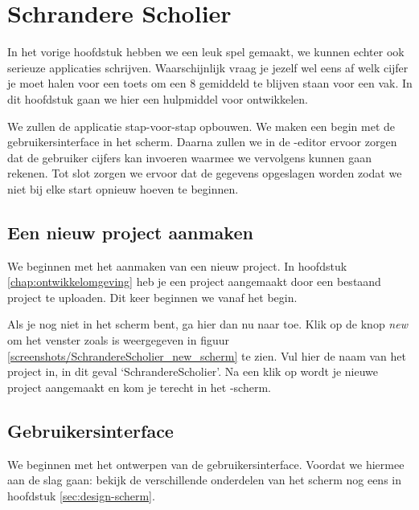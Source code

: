 \chapter{Schrandere Scholier}

In het vorige hoofdstuk hebben we een leuk spel gemaakt, we kunnen echter ook serieuze applicaties schrijven. Waarschijnlijk vraag je jezelf wel eens af welk cijfer je moet halen voor een toets om een 8 gemiddeld te blijven staan voor een vak. In dit hoofdstuk gaan we hier een hulpmiddel voor ontwikkelen.

We zullen de applicatie stap-voor-stap opbouwen. We maken een begin met de gebruikersinterface in het  scherm. Daarna zullen we in de -editor ervoor zorgen dat de gebruiker cijfers kan invoeren waarmee we vervolgens kunnen gaan rekenen. Tot slot zorgen we ervoor dat de gegevens opgeslagen worden zodat we niet bij elke start opnieuw hoeven te beginnen.

\section{Een nieuw project aanmaken}
We beginnen met het aanmaken van een nieuw project. In hoofdstuk \ref{chap:ontwikkelomgeving} heb je een project aangemaakt door een bestaand project te uploaden. Dit keer beginnen we vanaf het begin. 

Als je nog niet in het  scherm bent, ga hier dan nu naar toe. Klik op de knop \emph{new} om het venster zoals is weergegeven in figuur \ref{screenshots/SchrandereScholier_new_scherm} te zien. Vul hier de naam van het project in, in dit geval `SchrandereScholier'. Na een klik op  wordt je nieuwe project aangemaakt en kom je terecht in het -scherm.

\section{Gebruikersinterface}
We beginnen met het ontwerpen van de gebruikersinterface. Voordat we hiermee aan de slag gaan: bekijk de verschillende onderdelen van het scherm nog eens in hoofdstuk \ref{sec:design-scherm}.


